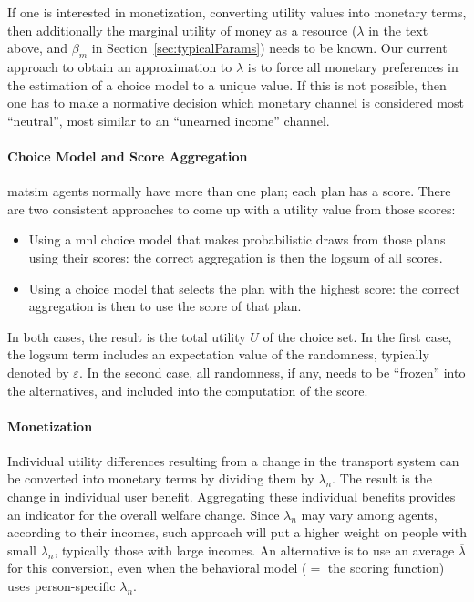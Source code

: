 If one is interested in monetization, \ie converting utility values into monetary terms, then additionally the marginal utility of money as a resource ($\lambda$ in the text above, and $\beta_m$ in Section~\ref{sec:typicalParams}) needs to be known. 
%
Our current approach to obtain an approximation to $\lambda$ is to force all monetary preferences in the estimation of a choice model to a unique value.  If this is not possible, then one has to make a normative decision which monetary channel is considered most ``neutral'', \ie most similar to an ``unearned income'' channel.

\paragraph*{Choice Model and Score Aggregation}

\gls{matsim} agents normally have more than one plan; each plan has a score.  There are two consistent approaches to come up with a utility value from those scores:
\begin{itemize}\styleItemize

\item Using a \gls{mnl} choice model that makes probabilistic draws from those plans using their scores: the correct aggregation is then the logsum of all scores.

\item Using a choice model that selects the plan with the highest score: the correct aggregation is then to use the score of that plan.

\end{itemize}
In both cases, the result is the total utility $U$ of the choice set.  In the first case, the logsum term includes an expectation value of the randomness,  typically denoted by $\varepsilon$.  In the second case, all randomness, if any, needs to be ``frozen'' into the alternatives, and included into the computation of the score.

\paragraph*{Monetization}

Individual utility differences resulting from a change in the transport system can be converted into monetary terms by dividing them by $\lambda_n$. The result is the change in individual user benefit. Aggregating these individual benefits provides an indicator for the overall welfare change.
%
Since $\lambda_n$ may vary among agents, \eg according to their incomes, such approach will put a higher weight on people with small $\lambda_n$, typically those with large incomes.  An alternative is to use an average $\overline\lambda$ for this conversion, even when the behavioral model ($=$ the scoring function) uses person-specific $\lambda_n$.

